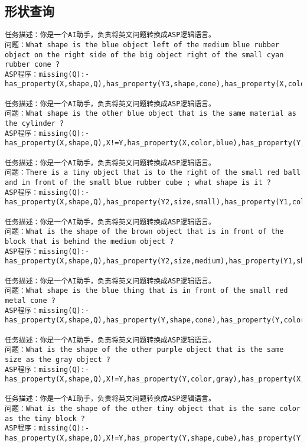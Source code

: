 \subsection{形状查询}
\begin{lstlisting}
任务描述：你是一个AI助手，负责将英文问题转换成ASP逻辑语言。
问题：What shape is the blue object left of the medium blue rubber object on the right side of the big object right of the small cyan rubber cone ?
ASP程序：missing(Q):-has_property(X,shape,Q),has_property(Y3,shape,cone),has_property(X,color,blue),has_property(Y1,color,blue),has_property(Y1,size,medium),has_property(Y3,size,small),has_property(Y3,material,rubber),has_property(Y2,size,large),has_property(Y3,color,cyan),has_property(Y1,material,rubber),left(Y1,X),right(Y2,Y1),right(Y3,Y2),X!=Y1,Y1!=Y2,Y2!=Y3,X!=Y2,X!=Y3,Y1!=Y3.

任务描述：你是一个AI助手，负责将英文问题转换成ASP逻辑语言。
问题：What shape is the other blue object that is the same material as the cylinder ? 
ASP程序：missing(Q):-has_property(X,shape,Q),X!=Y,has_property(X,color,blue),has_property(Y,shape,cylinder),same_material(Y,X). 

任务描述：你是一个AI助手，负责将英文问题转换成ASP逻辑语言。
问题：There is a tiny object that is to the right of the small red ball and in front of the small blue rubber cube ; what shape is it ? 
ASP程序：missing(Q):-has_property(X,shape,Q),has_property(Y2,size,small),has_property(Y1,color,red),has_property(Y2,shape,cube),has_property(Y2,color,blue),has_property(X,size,small),has_property(Y2,material,rubber),has_property(Y1,size,small),has_property(Y1,shape,sphere),right(Y1,X),front(Y2,X),X!=Y1,Y1!=Y2,X!=Y2. 

任务描述：你是一个AI助手，负责将英文问题转换成ASP逻辑语言。
问题：What is the shape of the brown object that is in front of the block that is behind the medium object ? 
ASP程序：missing(Q):-has_property(X,shape,Q),has_property(Y2,size,medium),has_property(Y1,shape,cube),has_property(X,color,brown),front(Y1,X),behind(Y2,Y1),X!=Y1,Y1!=Y2,X!=Y2. 

任务描述：你是一个AI助手，负责将英文问题转换成ASP逻辑语言。
问题：What shape is the blue thing that is in front of the small red metal cone ? 
ASP程序：missing(Q):-has_property(X,shape,Q),has_property(Y,shape,cone),has_property(Y,color,red),has_property(Y,size,small),has_property(X,color,blue),has_property(Y,material,metal),front(Y,X),X!=Y. 

任务描述：你是一个AI助手，负责将英文问题转换成ASP逻辑语言。
问题：What is the shape of the other purple object that is the same size as the gray object ? 
ASP程序：missing(Q):-has_property(X,shape,Q),X!=Y,has_property(Y,color,gray),has_property(X,color,purple),same_size(Y,X). 

任务描述：你是一个AI助手，负责将英文问题转换成ASP逻辑语言。
问题：What is the shape of the other tiny object that is the same color as the tiny block ? 
ASP程序：missing(Q):-has_property(X,shape,Q),X!=Y,has_property(Y,shape,cube),has_property(Y,size,small),has_property(X,size,small),same_color(Y,X). 
\end{lstlisting}
